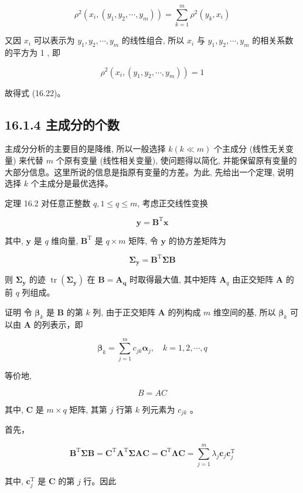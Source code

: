\documentclass[10pt]{article}
\begin{document}
$$
\rho^{2}\left(x_{i},\left(y_{1}, y_{2}, \cdots, y_{m}\right)\right)=\sum_{k=1}^{m} \rho^{2}\left(y_{k}, x_{i}\right)
$$

又因 $x_{i}$ 可以表示为 $y_{1}, y_{2}, \cdots, y_{m}$ 的线性组合, 所以 $x_{i}$ 与 $y_{1}, y_{2}, \cdots, y_{m}$ 的相关系数的平方为 1 , 即

$$
\rho^{2}\left(x_{i},\left(y_{1}, y_{2}, \cdots, y_{m}\right)\right)=1
$$

故得式 (16.22)。

\subsection*{16.1.4 主成分的个数}
主成分分析的主要目的是降维, 所以一般选择 $k(k \ll m)$ 个主成分 (线性无关变量) 来代替 $m$ 个原有变量 (线性相关变量), 使问题得以简化, 并能保留原有变量的大部分信息。这里所说的信息是指原有变量的方差。为此, 先给出一个定理, 说明选择 $k$ 个主成分是最优选择。

定理 16.2 对任意正整数 $q, 1 \leqslant q \leqslant m$, 考虑正交线性变换


\begin{equation*}
\boldsymbol{y}=\boldsymbol{B}^{\mathrm{T}} \boldsymbol{x} \tag{16.23}
\end{equation*}


其中, $\boldsymbol{y}$ 是 $q$ 维向量, $\boldsymbol{B}^{\mathrm{T}}$ 是 $q \times m$ 矩阵, 令 $\boldsymbol{y}$ 的协方差矩阵为


\begin{equation*}
\boldsymbol{\Sigma}_{\boldsymbol{y}}=\boldsymbol{B}^{\mathrm{T}} \boldsymbol{\Sigma} \boldsymbol{B} \tag{16.24}
\end{equation*}


则 $\boldsymbol{\Sigma}_{\boldsymbol{y}}$ 的迹 $\operatorname{tr}\left(\boldsymbol{\Sigma}_{\boldsymbol{y}}\right)$ 在 $\boldsymbol{B}=\boldsymbol{A}_{\boldsymbol{q}}$ 时取得最大值, 其中矩阵 $\boldsymbol{A}_{q}$ 由正交矩阵 $\boldsymbol{A}$ 的前 $q$ 列组成。

证明 令 $\boldsymbol{\beta}_{k}$ 是 $\boldsymbol{B}$ 的第 $k$ 列, 由于正交矩阵 $\boldsymbol{A}$ 的列构成 $m$ 维空间的基, 所以 $\boldsymbol{\beta}_{k}$ 可以由 $\boldsymbol{A}$ 的列表示，即

$$
\boldsymbol{\beta}_{k}=\sum_{j=1}^{m} c_{j k} \boldsymbol{\alpha}_{j}, \quad k=1,2, \cdots, q
$$

等价地,


\begin{equation*}
B=A C \tag{16.25}
\end{equation*}


其中, $\boldsymbol{C}$ 是 $m \times q$ 矩阵, 其第 $j$ 行第 $k$ 列元素为 $c_{j k}$ 。

首先，

$$
\boldsymbol{B}^{\mathrm{T}} \boldsymbol{\Sigma} \boldsymbol{B}=\boldsymbol{C}^{\mathrm{T}} \boldsymbol{A}^{\mathrm{T}} \boldsymbol{\Sigma} \boldsymbol{A} \boldsymbol{C}=\boldsymbol{C}^{\mathrm{T}} \boldsymbol{\Lambda} \boldsymbol{C}=\sum_{j=1}^{m} \lambda_{j} \boldsymbol{c}_{j} \boldsymbol{c}_{j}^{\mathrm{T}}
$$

其中, $\boldsymbol{c}_{j}^{\mathrm{T}}$ 是 $\boldsymbol{C}$ 的第 $j$ 行。因此
\end{document}
